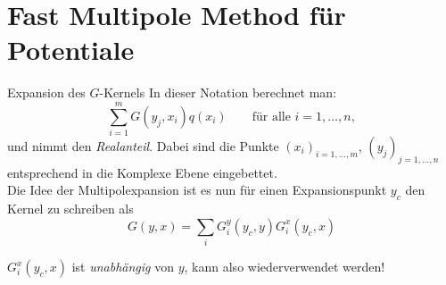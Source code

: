 \documentclass[ngerman]{beamer}
\begin{document}
\section{Fast Multipole Method für Potentiale}

\begin{frame}{Expansion des $G$-Kernels}
In dieser Notation berechnet man: 
\begin{equation*}\label{potential}
\sum_{i=1}^m {G(y_j,x_i)q(x_i)} \qquad \text{für alle }i=1,\ldots,n, 
\end{equation*}
und nimmt den \emph{Realanteil}. Dabei sind die Punkte $(x_i)_{i=1,\ldots,m}$, $(y_j)_{j=1,\ldots,n}$ entsprechend in die Komplexe Ebene eingebettet.\\
Die Idee der Multipolexpansion ist es nun für einen Expansionspunkt $y_c$ den Kernel zu schreiben als 
\begin{equation}
\nonumber
G(y,x) = \sum_i G_i^y(y_c,y)G_i^x(y_c,x)
\end{equation}
\begin{alertblock}

$G_i^x(y_c,x)$ ist \emph{unabhängig} von $y$, kann also wiederverwendet werden!

\end{alertblock}
\end{frame}
\end{document}
